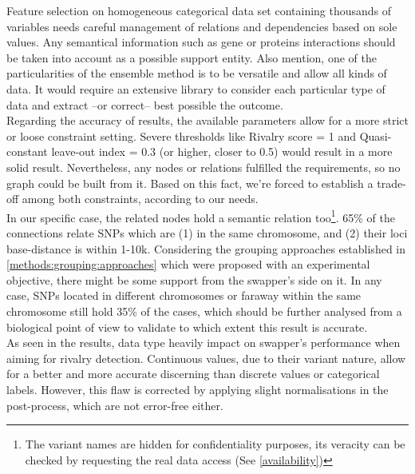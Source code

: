Feature selection on homogeneous categorical data set containing thousands of variables needs careful management of relations and dependencies based on sole values. Any semantical information such as gene or proteins interactions should be taken into account as a possible support entity. Also mention, one of the particularities of the ensemble method is to be versatile and allow all kinds of data. It would require an extensive library to consider each particular type of data and extract --or correct-- best possible the outcome.
\\

Regarding the accuracy of results, the available parameters allow for a more strict or loose constraint setting. Severe thresholds like Rivalry score = 1 and Quasi-constant leave-out index = 0.3 (or higher, closer to 0.5) would result in a more solid result. Nevertheless, any nodes or relations fulfilled the requirements, so no graph could be built from it. Based on this fact, we're forced to establish a trade-off among both constraints, according to our needs.
\\

In our specific case, the related nodes hold a semantic relation too\footnote{The variant names are hidden for confidentiality purposes, its veracity can be checked by requesting the real data access (See \ref{availability})}. 65\% of the connections relate SNPs which are (1) in the same chromosome, and (2) their loci base-distance is within 1-10k. Considering the grouping approaches established in \ref{methods:grouping:approaches} which were proposed with an experimental objective, there might be some support from the swapper's side on it. In any case, SNPs located in different chromosomes or faraway within the same chromosome still hold 35\% of the cases, which should be further analysed from a biological point of view to validate to which extent this result is accurate.
\\

As seen in the results, data type heavily impact on swapper's performance when aiming for rivalry detection. Continuous values, due to their variant nature, allow for a better and more accurate discerning than discrete values or categorical labels. However, this flaw is corrected by applying slight normalisations in the post-process, which are not error-free either.